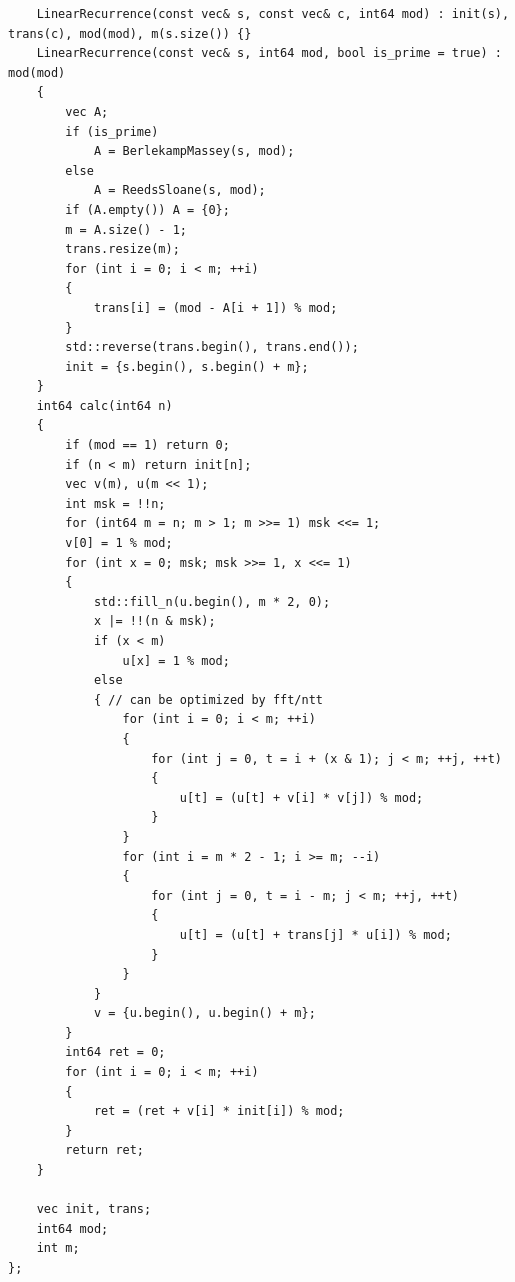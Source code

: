 \documentclass[twoside]{article}
\begin{document}
\begin{lstlisting}
    LinearRecurrence(const vec& s, const vec& c, int64 mod) : init(s), trans(c), mod(mod), m(s.size()) {}
    LinearRecurrence(const vec& s, int64 mod, bool is_prime = true) : mod(mod)
    {
        vec A;
        if (is_prime)
            A = BerlekampMassey(s, mod);
        else
            A = ReedsSloane(s, mod);
        if (A.empty()) A = {0};
        m = A.size() - 1;
        trans.resize(m);
        for (int i = 0; i < m; ++i)
        {
            trans[i] = (mod - A[i + 1]) % mod;
        }
        std::reverse(trans.begin(), trans.end());
        init = {s.begin(), s.begin() + m};
    }
    int64 calc(int64 n)
    {
        if (mod == 1) return 0;
        if (n < m) return init[n];
        vec v(m), u(m << 1);
        int msk = !!n;
        for (int64 m = n; m > 1; m >>= 1) msk <<= 1;
        v[0] = 1 % mod;
        for (int x = 0; msk; msk >>= 1, x <<= 1)
        {
            std::fill_n(u.begin(), m * 2, 0);
            x |= !!(n & msk);
            if (x < m)
                u[x] = 1 % mod;
            else
            { // can be optimized by fft/ntt
                for (int i = 0; i < m; ++i)
                {
                    for (int j = 0, t = i + (x & 1); j < m; ++j, ++t)
                    {
                        u[t] = (u[t] + v[i] * v[j]) % mod;
                    }
                }
                for (int i = m * 2 - 1; i >= m; --i)
                {
                    for (int j = 0, t = i - m; j < m; ++j, ++t)
                    {
                        u[t] = (u[t] + trans[j] * u[i]) % mod;
                    }
                }
            }
            v = {u.begin(), u.begin() + m};
        }
        int64 ret = 0;
        for (int i = 0; i < m; ++i)
        {
            ret = (ret + v[i] * init[i]) % mod;
        }
        return ret;
    }

    vec init, trans;
    int64 mod;
    int m;
};\end{lstlisting}
\end{document}
